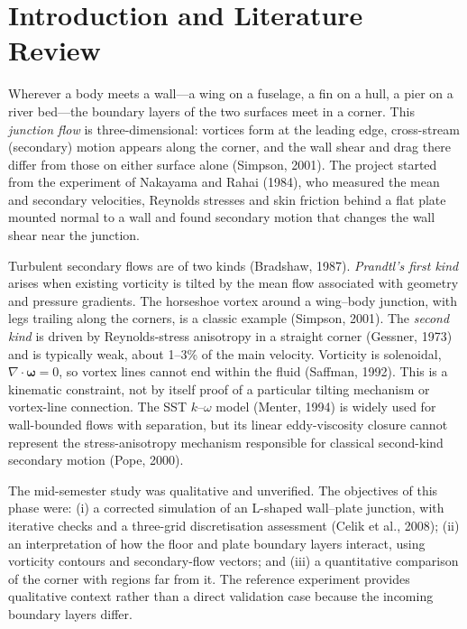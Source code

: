 \documentclass[12pt,a4paper,oneside]{report}
\begin{document}
\cleardoublepage
{}
\setcounter{page}{1}

\chapter{Introduction and Literature Review}
Wherever a body meets a wall---a wing on a fuselage, a fin on a hull, a pier on a river bed---the boundary layers of the two surfaces meet in a corner. This \emph{junction flow} is three-dimensional: vortices form at the leading edge, cross-stream (secondary) motion appears along the corner, and the wall shear and drag there differ from those on either surface alone (Simpson, 2001). The project started from the experiment of Nakayama and Rahai (1984), who measured the mean and secondary velocities, Reynolds stresses and skin friction behind a flat plate mounted normal to a wall and found secondary motion that changes the wall shear near the junction.

Turbulent secondary flows are of two kinds (Bradshaw, 1987). \emph{Prandtl's first kind} arises when existing vorticity is tilted by the mean flow associated with geometry and pressure gradients. The horseshoe vortex around a wing--body junction, with legs trailing along the corners, is a classic example (Simpson, 2001). The \emph{second kind} is driven by Reynolds-stress anisotropy in a straight corner (Gessner, 1973) and is typically weak, about 1--3\% of the main velocity. Vorticity is solenoidal, $\nabla\cdot\boldsymbol{\omega} = 0$, so vortex lines cannot end within the fluid (Saffman, 1992). This is a kinematic constraint, not by itself proof of a particular tilting mechanism or vortex-line connection. The SST $k$--$\omega$ model (Menter, 1994) is widely used for wall-bounded flows with separation, but its linear eddy-viscosity closure cannot represent the stress-anisotropy mechanism responsible for classical second-kind secondary motion (Pope, 2000).

The mid-semester study was qualitative and unverified. The objectives of this phase were: (i) a corrected simulation of an L-shaped wall--plate junction, with iterative checks and a three-grid discretisation assessment (Celik et al., 2008); (ii) an interpretation of how the floor and plate boundary layers interact, using vorticity contours and secondary-flow vectors; and (iii) a quantitative comparison of the corner with regions far from it. The reference experiment provides qualitative context rather than a direct validation case because the incoming boundary layers differ.
\end{document}
